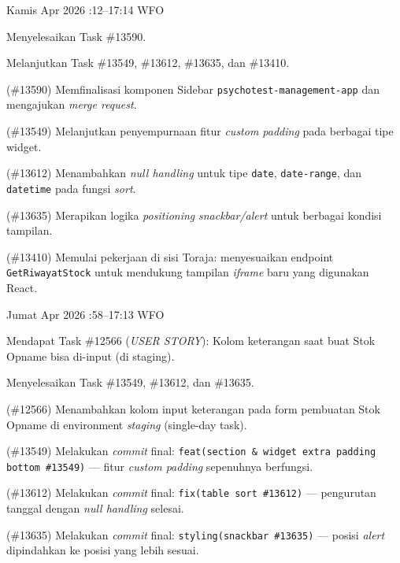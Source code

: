 \begin{logtable}
    {
        Kamis  Apr 2026 :12--17:14 \linebreak %
        WFO
    }{
        \begin{loglist}
            \item Menyelesaikan Task \#13590.
            \item Melanjutkan Task \#13549, \#13612, \#13635, dan \#13410.
        \end{loglist}
    }{
        \begin{logwork}
            \item (\#13590) Memfinalisasi komponen Sidebar \texttt{psychotest-management-app} dan mengajukan \textit{merge request}.
            \item (\#13549) Melanjutkan penyempurnaan fitur \textit{custom padding} pada berbagai tipe widget.
            \item (\#13612) Menambahkan \textit{null handling} untuk tipe \texttt{date}, \texttt{date-range}, dan \texttt{datetime} pada fungsi \textit{sort}.
            \item (\#13635) Merapikan logika \textit{positioning} \textit{snackbar/alert} untuk berbagai kondisi tampilan.
            \item (\#13410) Memulai pekerjaan di sisi Toraja: menyesuaikan endpoint \texttt{GetRiwayatStock} untuk mendukung tampilan \textit{iframe} baru yang digunakan React.
        \end{logwork}
    }

    {
        Jumat  Apr 2026 :58--17:13 \linebreak %
        WFO
    }{
        \begin{loglist}
            \item Mendapat Task \#12566 (\textit{USER STORY}): Kolom keterangan saat buat Stok
            Opname bisa di-input (di staging).
            \item Menyelesaikan Task \#13549, \#13612, dan \#13635.
        \end{loglist}
    }{
        \begin{logwork}
            \item (\#12566) Menambahkan kolom input keterangan pada form pembuatan Stok Opname di environment \textit{staging} (single-day task).
            \item (\#13549) Melakukan \textit{commit} final: \texttt{feat(section \& widget extra padding bottom \#13549)} --- fitur \textit{custom padding} sepenuhnya berfungsi.
            \item (\#13612) Melakukan \textit{commit} final: \texttt{fix(table sort \#13612)} --- pengurutan tanggal dengan \textit{null handling} selesai.
            \item (\#13635) Melakukan \textit{commit} final: \texttt{styling(snackbar \#13635)} --- posisi \textit{alert} dipindahkan ke posisi yang lebih sesuai.
        \end{logwork}
    }


\end{logtable}
